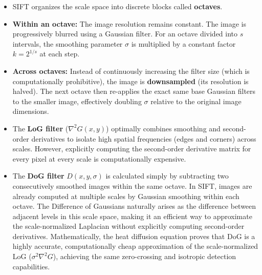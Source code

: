 {
\begin{itemize}
    \item SIFT organizes the scale space into discrete blocks called \textbf{octaves}. 
    \item \textbf{Within an octave:} The image resolution remains constant. The image is progressively blurred using a Gaussian filter. For an octave divided into $s$ intervals, the smoothing parameter $\sigma$ is multiplied by a constant factor $k = 2^{1/s}$ at each step.
    \item \textbf{Across octaves:} Instead of continuously increasing the filter size (which is computationally prohibitive), the image is \textbf{downsampled} (its resolution is halved). The next octave then re-applies the exact same base Gaussian filters to the smaller image, effectively doubling $\sigma$ relative to the original image dimensions.
\end{itemize}
}

{
\begin{itemize}
    \item The \textbf{LoG filter} ($\nabla^2 G(x,y)$) optimally combines smoothing and second-order derivatives to isolate high spatial frequencies (edges and corners) across scales. However, explicitly computing the second-order derivative matrix for every pixel at every scale is computationally expensive.
    \item The \textbf{DoG filter} $D(x, y, \sigma)$ is calculated simply by subtracting two consecutively smoothed images within the same octave. In SIFT, images are already computed at multiple scales by Gaussian smoothing within each octave. The Difference of Gaussians naturally arises as the difference between adjacent levels in this scale space, making it an efficient way to approximate the scale-normalized Laplacian without explicitly computing second-order derivatives. Mathematically, the heat diffusion equation proves that DoG is a highly accurate, computationally cheap approximation of the scale-normalized LoG ($\sigma^2 \nabla^2 G$), achieving the same zero-crossing and isotropic detection capabilities.
\end{itemize}
}

